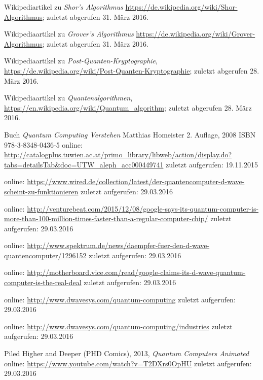 \begin{thebibliography}{9}
    Wikipediartikel zu \emph{Shor's Algorithmus}
    \url{https://de.wikipedia.org/wiki/Shor-Algorithmus};
    zuletzt abgerufen 31. März 2016.

    Wikipediaartikel zu \emph{Grover's Algorithmus}
    \url{https://de.wikipedia.org/wiki/Grover-Algorithmus};
    zuletzt abgerufen 31. März 2016.

    Wikipediaartikel zu \emph{Post-Quanten-Kryptographie},
    \url{https://de.wikipedia.org/wiki/Post-Quanten-Kryptographie};
    zuletzt abgerufen 28. März 2016.

    Wikipediaartikel zu \emph{Quantenalgorithmen},
    \url{https://en.wikipedia.org/wiki/Quantum_algorithm};
    zuletzt abgerufen 28. März 2016.

	Buch \emph{Quantum Computing Verstehen}
	Matthias Homeister
	2. Auflage, 2008
	ISBN 978-3-8348-0436-5
	online: \url{http://catalogplus.tuwien.ac.at/primo_library/libweb/action/display.do?tabs=detailsTab&doc=UTW_aleph_acc000449741}
	zuletzt aufgerufen: 19.11.2015

	online: \url{https://www.wired.de/collection/latest/der-quantencomputer-d-wave-scheint-zu-funktionieren}
	zuletzt aufgerufen: 29.03.2016
	
	online: \url{http://venturebeat.com/2015/12/08/google-says-its-quantum-computer-is-more-than-100-million-times-faster-than-a-regular-computer-chip/}
	zuletzt aufgerufen: 29.03.2016
	
	online: \url{http://www.spektrum.de/news/daempfer-fuer-den-d-wave-quantencomputer/1296152}
	zuletzt aufgerufen: 29.03.2016
	
	online: \url{http://motherboard.vice.com/read/google-claims-its-d-wave-quantum-computer-is-the-real-deal}
	zuletzt aufgerufen: 29.03.2016
	
	online: \url{http://www.dwavesys.com/quantum-computing}
	zuletzt aufgerufen: 29.03.2016
	
	online: \url{http://www.dwavesys.com/quantum-computing/industries}
	zuletzt aufgerufen: 29.03.2016
	
	Piled Higher and Deeper (PHD Comics),
	2013,
	\emph{Quantum Computers Animated}
	online: \url{https://www.youtube.com/watch?v=T2DXrs0OpHU}
	zuletzt aufgerufen: 29.03.2016
	
\end{thebibliography}
